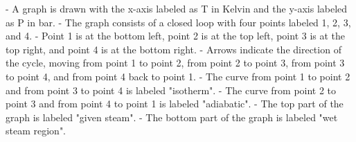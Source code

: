 - A graph is drawn with the x-axis labeled as T in Kelvin and the y-axis labeled as P in bar.
- The graph consists of a closed loop with four points labeled 1, 2, 3, and 4.
- Point 1 is at the bottom left, point 2 is at the top left, point 3 is at the top right, and point 4 is at the bottom right.
- Arrows indicate the direction of the cycle, moving from point 1 to point 2, from point 2 to point 3, from point 3 to point 4, and from point 4 back to point 1.
- The curve from point 1 to point 2 and from point 3 to point 4 is labeled "isotherm".
- The curve from point 2 to point 3 and from point 4 to point 1 is labeled "adiabatic".
- The top part of the graph is labeled "given steam".
- The bottom part of the graph is labeled "wet steam region".
